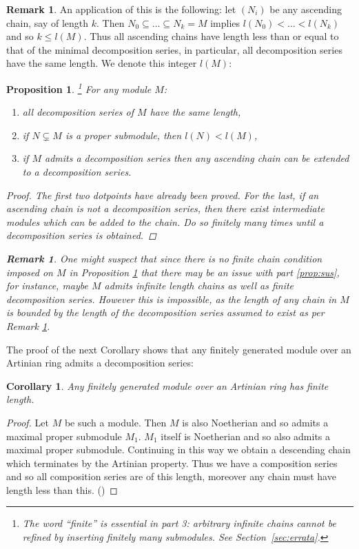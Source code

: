 \documentclass[12pt]{article}
\theoremstyle{plain}
\newtheorem{proposition}[thm]{Proposition}
\newtheorem{cor}[thm]{Corollary}
\theoremstyle{definition}
\newtheorem{remark}[thm]{Remark}
\begin{document}
\begin{remark}
\label{remark:saving_grace}
An application of this is the following: let $(N_i)$ be any ascending chain, say of length $k$. Then $N_0 \subseteq \hdots \subseteq N_k = M$ implies $l(N_0) < \hdots < l(N_k)$ and so $k \leq l(M)$. Thus all ascending chains have length less than or equal to that of the minimal decomposition series, in particular, all decomposition series have the same length. We denote this integer $l(M)$:
\end{remark}
\begin{proposition}
\label{prop:decomposition_series_basics}\footnote{The word ``finite'' is essential in part 3: arbitrary infinite chains cannot be refined by inserting finitely many submodules. See Section~\ref{sec:errata}.}
For any module $M$:
\begin{enumerate}
    \item all decomposition series of $M$ have the same length,
    \item if $N \subsetneq M$ is a proper submodule, then $l(N)<l(M)$,
    \item\label{prop:sus} if $M$ admits a decomposition series then any ascending chain can be extended to a decomposition series.
\end{enumerate}
\begin{proof}
The first two dotpoints have already been proved. For the last, if an ascending chain is not a decomposition series, then there exist intermediate modules which can be added to the chain. Do so finitely many times until a decomposition series is obtained.
\end{proof}
\begin{remark}
One might suspect that since there is no finite chain condition imposed on $M$ in Proposition \ref{prop:decomposition_series_basics} that there may be an issue with part \ref{prop:sus}, for instance, maybe $M$ admits infinite length chains as well as finite decomposition series. However this is impossible, as the length of any chain in $M$ is bounded by the length of the decomposition series assumed to exist as per Remark \ref{remark:saving_grace}.
\end{remark}
\end{proposition}
The proof of the next Corollary shows that any finitely generated module over an Artinian ring admits a decomposition series:
\begin{cor}
Any finitely generated module over an Artinian ring has finite length.
\end{cor}
\begin{proof}
Let $M$ be such a module. Then $M$ is also Noetherian and so admits a maximal proper submodule $M_1$. $M_1$ itself is Noetherian and so also admits a maximal proper submodule. Continuing in this way we obtain a descending chain which terminates by the Artinian property. Thus we have a composition series and so all composition series are of this length, moreover any chain must have length less than this. (\cite[\S 6]{atiyah_macdonald})
\end{proof}
\end{document}
